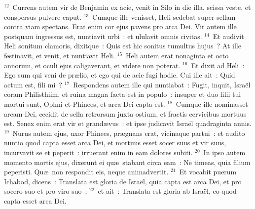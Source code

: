 ${}^{12}$~Currens autem vir de Benjamin ex acie, venit in Silo in die illa, scissa veste, et conspersus pulvere caput.
${}^{13}$~Cumque ille venisset, Heli sedebat super sellam contra viam spectans. Erat enim cor ejus pavens pro arca Dei. Vir autem ille postquam ingressus est, nuntiavit urbi~: et ululavit omnis civitas.
${}^{14}$~Et audivit Heli sonitum clamoris, dixitque~: Quis est hic sonitus tumultus hujus~? At ille festinavit, et venit, et nuntiavit Heli.
${}^{15}$~Heli autem erat nonaginta et octo annorum, et oculi ejus caligaverant, et videre non poterat.
${}^{16}$~Et dixit ad Heli~: Ego sum qui veni de pr\ae lio, et ego qui de acie fugi hodie. Cui ille ait~: Quid actum est, fili mi~?
${}^{17}$~Respondens autem ille qui nuntiabat~: Fugit, inquit, Isra\"el coram Philisthiim, et ruina magna facta est in populo~: insuper et duo filii tui mortui sunt, Ophni et Phinees, et arca Dei capta est.
${}^{18}$~Cumque ille nominasset arcam Dei, cecidit de sella retrorsum juxta ostium, et fractis cervicibus mortuus est. Senex enim erat vir et grand\ae vus~: et ipse judicavit Isra\"el quadraginta annis.
${}^{19}$~Nurus autem ejus, uxor Phinees, pr\ae gnans erat, vicinaque partui~: et audito nuntio quod capta esset arca Dei, et mortuus esset socer suus et vir suus, incurvavit se et peperit~: irruerant enim in eam dolores subiti.
${}^{20}$~In ipso autem momento mortis ejus, dixerunt ei qu\ae\ stabant circa eam~: Ne timeas, quia filium peperisti. Qu\ae\ non respondit eis, neque animadvertit.
${}^{21}$~Et vocabit puerum Ichabod, dicens~: Translata est gloria de Isra\"el, quia capta est arca Dei, et pro socero suo et pro viro suo~;
${}^{22}$~et ait~: Translata est gloria ab Isra\"el, eo quod capta esset arca Dei.

